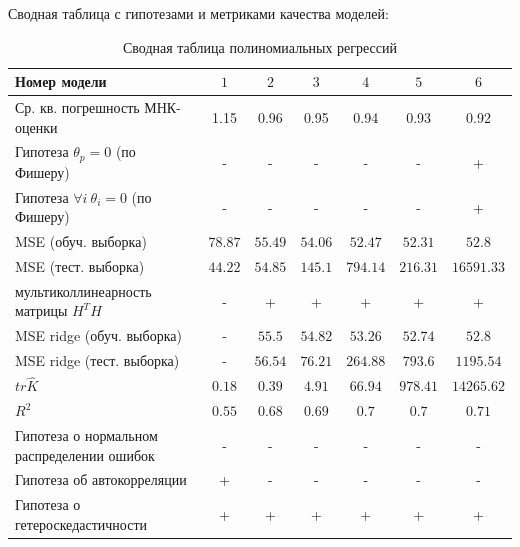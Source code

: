 \documentclass[a4paper,12pt]{article}
\begin{document}
Сводная таблица с гипотезами и метриками качества моделей:
\begin{table}[H]
    \begin{center}
            \begin{tabular}{|l|c|c|c|c|c|c|}
                \hline
                Номер модели & $1$ & $2$ & $3$ & $4$ & $5$ & $6$ \\ \hline
                Ср. кв. погрешность МНК-оценки & 1.15 & 0.96 & 0.95 & 0.94 & 0.93 & 0.92 \\ \hline
                Гипотеза $\theta_p = 0$ (по Фишеру) & - & - & - & - & - & + \\ \hline
                Гипотеза $\forall i~\theta_i = 0$ (по Фишеру) & - & - & - & - & - & + \\ \hline
                MSE (обуч. выборка) & $78.87$ & $55.49$ & $54.06$ & $52.47$ & $52.31$ & $52.8$ \\ \hline
                MSE (тест. выборка) & $44.22$ & $54.85$ & $145.1$ & $794.14$ & $216.31$ & $16591.33$ \\ \hline
                мультиколлинеарность матрицы $H^T H$ & - & + & + & + & + & + \\ \hline
                MSE ridge (обуч. выборка) & - & $55.5$ & $54.82$ & $53.26$ & $52.74$ & $52.8$ \\ \hline
                MSE ridge (тест. выборка) & - & $56.54$ & $76.21$ & $264.88$ & $793.6$ & $1195.54$ \\ \hline
                $tr \hat K$ & $0.18$ & $0.39$ & $4.91$ & $66.94$ & $978.41$ & $14265.62$ \\ \hline
                $R^2$ & $0.55$ & $0.68$ & $0.69$ & $0.7$ & $0.7$ & $0.71$ \\ \hline
                Гипотеза о нормальном распределении ошибок & - & - & - & - & - & - \\ \hline
                Гипотеза об автокорреляции & + & - & - & - & - & - \\ \hline
                Гипотеза о гетероскедастичности & + & + & + & + & + & + \\ \hline
            \end{tabular}
        \caption{Сводная таблица полиномиальных регрессий}
        \label{poly_table}
    \end{center}
\end{table}
\end{document}

